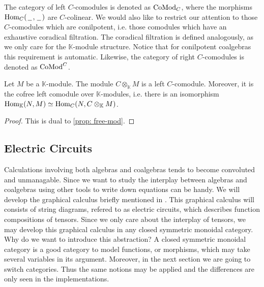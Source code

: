 \documentclass[../thesis.tex]{subfiles}
\begin{document}
            The category of left $C$-comodules is denoted as $\tt{CoMod}_C$, where the morphisms $\tt{Hom}_C(\argument,\argument)$ are $C$-colinear. We would also like to restrict our attention to those $C$-comodules which are conilpotent, i.e. those comodules which have an exhaustive coradical filtration. The coradical filtration is defined analogously, as we only care for the $\mathbb{K}$-module structure. Notice that for conilpotent coalgebras this requirement is automatic. Likewise, the category of right $C$-comodules is denoted as $\tt{CoMod}^C$.

            \begin{proposition}\label{prop: cofree-comod}
                Let $M$ be a $\mathbb{K}$-module. The module $C\otimes_{\mathbb{K}}M$ is a left $C$-comodule. Moreover, it is the cofree left comodule over $\mathbb{K}$-modules, i.e. there is an isomorphism $\tt{Hom}_{\mathbb{K}}(N,M)\simeq \tt{Hom}_C(N,C\otimes_{\mathbb{K}}M)$. 
            \end{proposition}

            \begin{proof}
                This is dual to \ref{prop: free-mod}.
            \end{proof}

    \subsection{Electric Circuits}
            Calculations involving both algebras and coalgebras tends to become convoluted and unmanagable. Since we want to study the interplay between algebras and coalgebras using other tools to write down equations can be handy. We will develop the graphical calculus briefly mentioned in \cite{Loday12}. This graphical calculus will consists of string diagrams, refered to as electric circuits, which describes function compositions of tensors. Since we only care about the interplay of tensors, we may develop this graphical calculus in any closed symmetric monoidal category. Why do we want to introduce this abstraction? A closed symmetric monoidal category is a good category to model functions, or morphisms, which may take several variables in its argument. Moreover, in the next section we are going to switch categories. Thus the same notions may be applied and the differences are only seen in the implementations.
            
\end{document}
